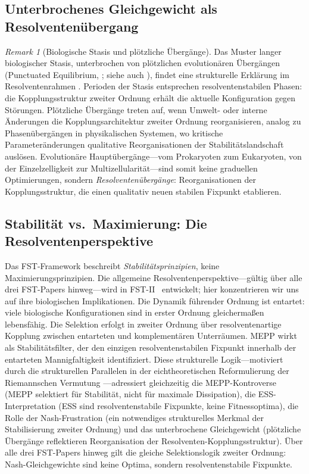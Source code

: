 \documentclass[12pt,a4paper]{article}
\theoremstyle{remark}
\newtheorem{remark}{Remark}
\begin{document}
\subsection{Unterbrochenes Gleichgewicht als Resolventen\"ubergang}

\begin{remark}[Biologische Stasis und pl\"otzliche \"Uberg\"ange]
\label{rem:punctuated-equilibrium}
Das Muster langer biologischer Stasis, unterbrochen von pl\"otzlichen evolution\"aren \"Uberg\"angen (Punctuated Equilibrium, \citealp{GouldEldredge1977}; siehe auch \citealp{KauffmanOrigins}), findet eine strukturelle Erkl\"arung im Resolventenrahmen \citep{GeigerRH2026b}. Perioden der Stasis entsprechen resolventenstabilen Phasen: die Kopplungsstruktur zweiter Ordnung erh\"alt die aktuelle Konfiguration gegen St\"orungen. Pl\"otzliche \"Uberg\"ange treten auf, wenn Umwelt- oder interne \"Anderungen die Kopplungsarchitektur zweiter Ordnung reorganisieren, analog zu Phasen\"uberg\"angen in physikalischen Systemen, wo kritische Parameter\"anderungen qualitative Reorganisationen der Stabilit\"atslandschaft ausl\"osen. Evolution\"are Haupt\"uberg\"ange---vom Prokaryoten zum Eukaryoten, von der Einzelzelligkeit zur Multizellularit\"at---sind somit keine graduellen Optimierungen, sondern \emph{Resolventen\"uberg\"ange}: Reorganisationen der Kopplungsstruktur, die einen qualitativ neuen stabilen Fixpunkt etablieren.
\end{remark}

\subsection{Stabilit\"at vs.\ Maximierung: Die Resolventenperspektive}

Das FST-Framework beschreibt \emph{Stabilit\"atsprinzipien}, keine Maximierungsprinzipien. Die allgemeine Resolventenperspektive---g\"ultig \"uber alle drei FST-Papers hinweg---wird in FST-II~\citep{FSTII} entwickelt; hier konzentrieren wir uns auf ihre biologischen Implikationen. Die Dynamik f\"uhrender Ordnung ist entartet: viele biologische Konfigurationen sind in erster Ordnung gleicherma\ss{}en lebensfähig. Die Selektion erfolgt in zweiter Ordnung \"uber resolventenartige Kopplung zwischen entarteten und komplement\"aren Unterr\"aumen. MEPP wirkt als Stabilit\"atsfilter, der den einzigen resolventenstabilen Fixpunkt innerhalb der entarteten Mannigfaltigkeit identifiziert. Diese strukturelle Logik---motiviert durch die strukturellen Parallelen in der eichtheoretischen Reformulierung der Riemannschen Vermutung \citep{GeigerRH2026b}---adressiert gleichzeitig die MEPP-Kontroverse (MEPP selektiert f\"ur Stabilit\"at, nicht f\"ur maximale Dissipation), die ESS-Interpretation (ESS sind resolventenstabile Fixpunkte, keine Fitnessoptima), die Rolle der Nash-Frustration (ein notwendiges strukturelles Merkmal der Stabilisierung zweiter Ordnung) und das unterbrochene Gleichgewicht (pl\"otzliche \"Uberg\"ange reflektieren Reorganisation der Resolventen-Kopplungsstruktur). \"Uber alle drei FST-Papers hinweg gilt die gleiche Selektionslogik zweiter Ordnung: Nash-Gleichgewichte sind keine Optima, sondern resolventenstabile Fixpunkte.
\end{document}
